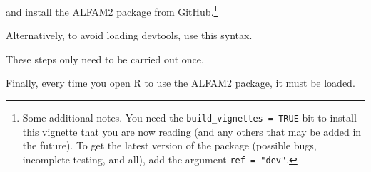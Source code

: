 \documentclass{article}
\begin{document}
\begin{knitrout}
\color{fgcolor}\begin{kframe}
\begin{alltt}
\end{alltt}
\end{kframe}
\end{knitrout}

and install the ALFAM2 package from GitHub.\footnote{
  Some additional notes.
  You need the \texttt{build\_vignettes = TRUE} bit to install this vignette that you are now reading (and any others that may be added in the future).
  To get the latest version of the package (possible bugs, incomplete testing, and all), add the argument \texttt{ref = "dev"}.
}

\begin{knitrout}
\color{fgcolor}\begin{kframe}
\begin{alltt}
\hlstd{(}\hlstd{,}  \hlstd{=} \hlstd{)}
\end{alltt}
\end{kframe}
\end{knitrout}

Alternatively, to avoid loading devtools, use this syntax.

\begin{knitrout}
\color{fgcolor}\begin{kframe}
\begin{alltt}
\hlopt{::}\hlstd{(}\hlstd{,}  \hlstd{=} \hlstd{)}
\end{alltt}
\end{kframe}
\end{knitrout}

These steps only need to be carried out once.

Finally, every time you open R to use the ALFAM2 package, it must be loaded.

\begin{knitrout}
\color{fgcolor}\begin{kframe}
\begin{alltt}
\end{alltt}
\end{kframe}
\end{knitrout}
\end{document}
